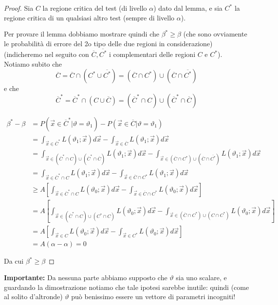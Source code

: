 \begin{proof}

Sia $C$ la regione critica del test (di livello $\alpha$) dato dal lemma, e sia $C^*$ la regione critica di un qualsiasi altro test (sempre di livello $\alpha$).

Per provare il lemma dobbiamo mostrare quindi che $\beta^* \geq \beta$ 
(che sono ovviamente le probabilità di errore del 2o tipo delle due regioni in considerazione)
(indicheremo nel seguito con $\overline{C}, \overline{C^*}$ i complementari delle regioni $C$ e $C^*$).
Notiamo subito che
$$\overline{C} = \overline{C} \cap ({C^*} \cup \overline{C^*}) = (\overline{C} \cap {C^*}) \cup (\overline{C} \cap \overline{C^*})$$
e che 
$$\overline{C}^* = \overline{C}^* \cap ({C} \cup \overline{C}) = (\overline{C}^* \cap {C}) \cup (\overline{C}^* \cap \overline{C})$$

\begin{align*}
\beta^* - \beta 
&= P(\vec{x} \in \overline{C}^* | \vartheta = \vartheta_1) 
	- P(\vec{x} \in \overline{C} | \vartheta = \vartheta_1)
\\ &= \int_{\vec{x} \in \overline{C}^* } L(\vartheta_1;\vec{x}) d \vec{x} 
	- \int_{\vec{x} \in \overline{C} } L(\vartheta_1;\vec{x}) d \vec{x}
\\ &= \int_{\vec{x} \in (\overline{C}^* \cap {C}) \cup (\overline{C}^* \cap \overline{C}) } L(\vartheta_1;\vec{x}) d \vec{x} 
	- \int_{\vec{x} \in (\overline{C} \cap {C^*}) \cup (\overline{C} \cap \overline{C^*}) } L(\vartheta_1;\vec{x}) d \vec{x}
\\ &= \int_{\vec{x} \in \overline{C}^* \cap C } L(\vartheta_1;\vec{x}) d \vec{x} 
	- \int_{\vec{x} \in \overline{C} \cap C^* } L(\vartheta_1;\vec{x}) d \vec{x}
\\ & \geq A \left[  \int_{\vec{x} \in \overline{C}^* \cap C } L(\vartheta_0;\vec{x}) d \vec{x} 
	- \int_{\vec{x} \in \overline{C} \cap C^* } L(\vartheta_0;\vec{x}) d \vec{x} \right]
\\ & = A \left[ \int_{\vec{x} \in (\overline{C}^* \cap {C}) \cup ({C}^* \cap {C}) } L(\vartheta_0;\vec{x}) d \vec{x} 
	- \int_{\vec{x} \in (\overline{C} \cap {C^*}) \cup ({C} \cap {C^*}) } L(\vartheta_0;\vec{x}) d \vec{x} \right]
\\ & = A \left[  \int_{\vec{x} \in C} L(\vartheta_0;\vec{x}) d \vec{x} 
	- \int_{\vec{x} \in C^* } L(\vartheta_0;\vec{x}) d \vec{x} \right]
\\ & = A ( \alpha - \alpha) = 0
\end{align*}

Da cui $\beta^* \geq \beta $
\end{proof}

\noindent \textbf{Importante:} Da nessuna parte abbiamo supposto che $\vartheta$ sia uno scalare, e guardando la dimostrazione notiamo che tale ipotesi sarebbe inutile: quindi (come al solito d'altronde) $\vartheta$ può benissimo essere un vettore di parametri incogniti!\\
\\